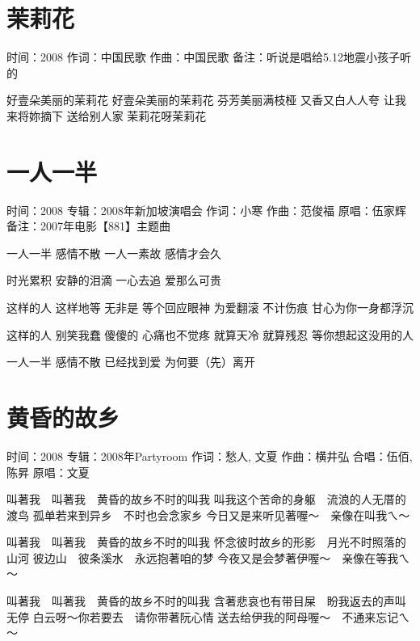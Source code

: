 \documentclass[UTF8,a4paper,oneside,twocolumn,12pt]{ctexbook}
\newcommand{\infopair}[2]{\textbullet #1：#2}
\newcommand{\zc}[1][伍佰]{\infopair{作词}{#1}}
\newcommand{\zq}[1][伍佰]{\infopair{作曲}{#1}}
\newcommand{\zj}[1]{\infopair{专辑}{#1}}
\newcommand{\yc}[1]{\infopair{原唱}{#1}}
\newcommand{\sj}[1]{\infopair{时间}{#1}}
\newcommand{\bz}[1]{\infopair{备注}{#1}}
\newenvironment{info}{\begin{flushleft}\kaishu
	}
	{\end{flushleft}\normalsize\yahei\par}
\newenvironment{lyric}{
	}
{}
\begin{document}
\section{茉莉花}
\begin{info}
	\sj{2008}
	\zc[中国民歌]
	\zq[中国民歌]
	\bz{听说是唱给5.12地震小孩子听的}
\end{info}
\begin{lyric}
	好壹朵美丽的茉莉花
	好壹朵美丽的茉莉花
	芬芳美丽满枝桠 又香又白人人夸
	让我来将妳摘下 送给别人家
	茉莉花呀茉莉花
\end{lyric}

\section{一人一半}
\begin{info}
	\sj{2008}
	\zj{2008年新加坡演唱会}
	\zc[小寒]
	\zq[范俊福]
	\yc{伍家辉}
	\bz{2007年电影【881】主题曲}
\end{info}
\begin{lyric}
	一人一半 感情不散
	一人一素故 感情才会久

	时光累积 安静的泪滴
	一心去追 爱那么可贵

	这样的人 这样地等
	无非是 等个回应眼神
	为爱翻滚 不计伤痕
	甘心为你一身都浮沉

	这样的人 别笑我蠢
	傻傻的 心痛也不觉疼
	就算天冷 就算残忍
	等你想起这没用的人

	一人一半 感情不散
	已经找到爱 为何要（先）离开
\end{lyric}

\section{黄昏的故乡}
\begin{info}
	\sj{2008}
	\zj{2008年Partyroom}
	\zc[愁人, 文夏]
	\zq[横井弘]
	\infopair{合唱}{伍佰, 陈昇}
	\yc{文夏}
\end{info}
\begin{lyric}
	叫著我　叫著我　黄昏的故乡不时的叫我
	叫我这个苦命的身躯　流浪的人无厝的渡鸟
	孤单若来到异乡　不时也会念家乡
	今日又是来听见著喔～　亲像在叫我ㄟ～

	叫著我　叫著我　黄昏的故乡不时的叫我
	怀念彼时故乡的形影　月光不时照落的山河
	彼边山　彼条溪水　永远抱著咱的梦
	今夜又是会梦著伊喔～　亲像在等我ㄟ～

	叫著我　叫著我　黄昏的故乡不时的叫我
	含著悲哀也有带目屎　盼我返去的声叫无停
	白云呀～你若要去　请你带著阮心情
	送去给伊我的阿母喔～　不通来忘记ㄟ～
\end{lyric}
\end{document}
